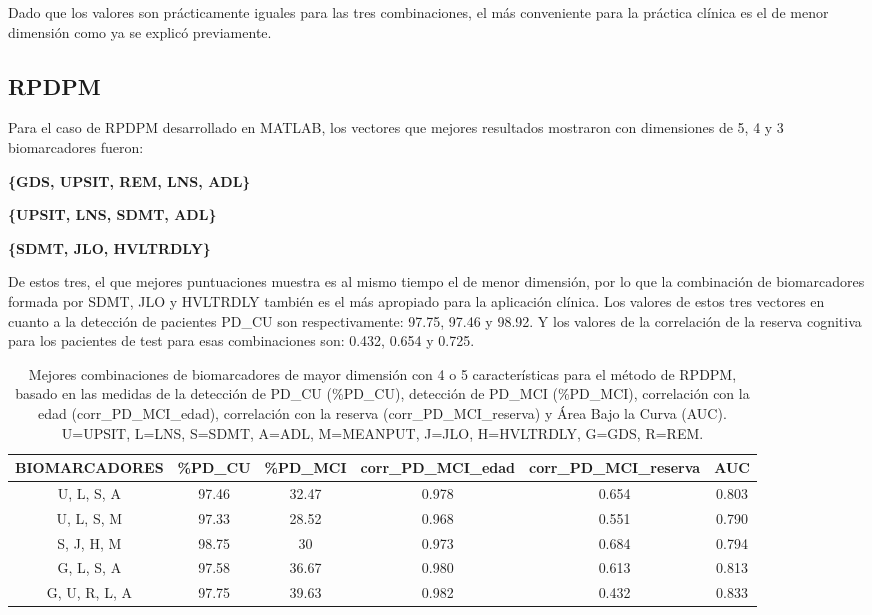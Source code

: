 Dado que los valores son prácticamente iguales para las tres combinaciones, el más  conveniente para la práctica clínica es el de menor dimensión como ya se explicó previamente. \\

\subsection{RPDPM}
Para el caso de RPDPM desarrollado en MATLAB, los vectores que mejores resultados mostraron con dimensiones de 5, 4 y 3 biomarcadores fueron:

\begin{center}
	\textbf{\{GDS, UPSIT, REM, LNS, ADL\}}		
\end{center}
\begin{center}
	\textbf{\{UPSIT, LNS, SDMT, ADL\}}
\end{center}
\begin{center}
	\textbf{\{SDMT, JLO, HVLTRDLY\}}
\end{center}

De estos tres, el que mejores puntuaciones muestra es al mismo tiempo el de menor dimensión, por lo que la combinación de biomarcadores formada por SDMT, JLO y HVLTRDLY también es el más apropiado para la aplicación clínica. Los valores de estos tres vectores en cuanto a la detección de pacientes PD\_CU son respectivamente: 97.75, 97.46 y 98.92. Y los valores de la correlación de la reserva cognitiva para los pacientes de test para esas combinaciones son: 0.432, 0.654 y 0.725.\\

\begin{table}[H]
	\centering
	\begin{adjustbox}{max width=\textwidth}
		\begin{tabular}{|c|c|c|c|c|c|}
			\hline
			\textbf{BIOMARCADORES} & \textbf{\%PD\_CU} & \textbf{\%PD\_MCI} & \textbf{corr\_PD\_MCI\_edad} & \textbf{corr\_PD\_MCI\_reserva} & \textbf{AUC} \\ \hline
			U, L, S, A  & 97.46 & 32.47 & 0.978 & 0.654 & 0.803 \\ \hline
			U, L, S, M  & 97.33 & 28.52 & 0.968 & 0.551 & 0.790 \\ \hline
			S, J, H, M & 98.75 & 30 & 0.973 & 0.684 & 0.794 \\ \hline
			G, L, S, A  & 97.58 & 36.67 & 0.980 & 0.613 & 0.813 \\ \hline
			G, U, R, L, A & 97.75 & 39.63 & 0.982 & 0.432 & 0.833 \\ \hline
		\end{tabular}
	\end{adjustbox}
	\caption{Mejores combinaciones de biomarcadores de mayor dimensión con 4 o 5 características para el método de RPDPM, basado en las medidas de la detección de PD\_CU (\%PD\_CU), detección de PD\_MCI (\%PD\_MCI), correlación con la edad (corr\_PD\_MCI\_edad), correlación con la reserva (corr\_PD\_MCI\_reserva) y Área Bajo la Curva (AUC). U=UPSIT, L=LNS, S=SDMT, A=ADL, M=MEANPUT, J=JLO, H=HVLTRDLY, G=GDS, R=REM.}
	\label{tab:RPDPM4y5}
\end{table}

